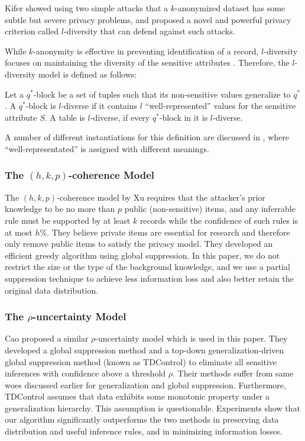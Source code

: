 Kifer \etal \cite{Kifer:l-diversity} showed using two simple attacks that a
$k$-anonymized dataset has some subtle but severe privacy problems, and
proposed a novel and powerful privacy criterion called $l$-diversity that
can defend against such attacks.

While $k$-anonymity is effective in preventing identification of a record,
$l$-diversity focuses on maintaining the diversity of the sensitive attributes \cite{aggarwal2008general}.
Therefore, the $l$-diversity model is defined as follows:

\begin{definition}
  Let a $q^*$-block be a set of tuples such that its non-sensitive values
  generalize to $q^*$.  A $q^*$-block is $l$-diverse if it contains $l$
  ``well-represented'' values for the sensitive attribute $S$.  A table
  is $l$-diverse, if every $q^*$-block in it is $l$-diverse.
\end{definition}

A number of different instantiations for this definition are discussed
in \cite{Kifer:l-diversity}, where ``well-representated'' is assigned with
different meanings.

\subsubsection{The $(h,k,p)$-coherence Model}

The $(h,k,p)$-coherence model by Xu \etal \cite{Xu:2008:ATD}
requires that the attacker's prior knowledge to be no more than $p$ public
(non-sensitive) items, and any inferrable rule must be supported by at least
$k$ records while the confidence of such rules is at most $h$\%. They believe
private items are essential for research and therefore only remove public
items to satisfy the privacy model. They developed an efficient greedy
algorithm using global suppression. In this paper, we do not restrict the
size or the type of the background knowledge, and we use a partial
suppression technique to achieve less information loss and also better retain
the original data distribution.

\subsubsection{The $\rho$-uncertainty Model}

Cao \etal \cite{Cao:2010:rho} proposed a similar $\rho$-uncertainty model
which is used in this paper.
They developed a global suppression method and a top-down
generalization-driven global suppression method (known as TDControl)
to eliminate all sensitive inferences with confidence above
a threshold $\rho$.
Their methods suffer from same woes discussed earlier for generalization and
global suppression.
Furthermore, TDControl 
assumes that data exhibits some monotonic property under a generalization
hierarchy. This assumption is questionable.
Experiments show that our algorithm significantly outperforms the 
two methods in preserving data distribution and useful
inference rules, and in minimizing information losses.

